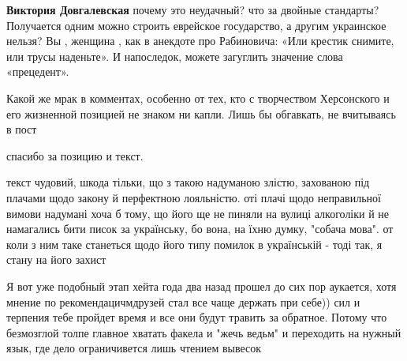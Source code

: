 \begin{itemize}
\begin{itemize}
\textbf{Виктория Довгалевская} почему это неудачный? что за двойные стандарты? Получается одним можно строить еврейское государство, а другим украинское нельзя? Вы , женщина , как в анекдоте про Рабиновича: «Или крестик снимите, или трусы наденьте». И напоследок, можете загуглить значение слова «прецедент».
\end{itemize}

 
Какой же мрак в комментах, особенно от тех, кто с творчеством Херсонского и его
жизненной позицией не знаком ни капли. Лишь бы обгавкать, не вчитываясь в пост


 
спасибо за позицию и текст.

 

текст чудовий, шкода тільки, що з такою надуманою злістю, захованою під плачами
щодо закону й перфектною лояльністю. оті плачі щодо неправильної вимови
надумані хоча б тому, що його ще не пиняли на вулиці алкоголіки й не намагались
бити писок за українську, бо вона, на їхню думку, "собача мова". от коли з ним
таке станеться щодо його типу помилок в українській - тоді так, я стану на його
захист

 

Я вот уже подобный этап хейта года два назад прошел до сих пор аукается, хотя
мнение по рекомендацичмдрузей стал все чаще держать при себе)) сил и терпения
тебе \Smiley[1.0][yellow] пройдет время и все они будут травить за обратное. Потому что
безмозглой толпе главное хватать факела и "жечь ведьм" и переходить на нужный
язык, где дело ограничивется лишь чтением вывесок


\end{itemize}
